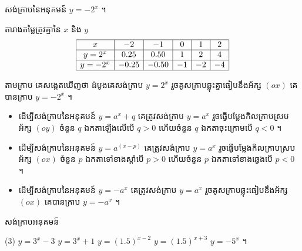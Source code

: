 \begin{example}[ឧទាហរណ៍ ឃ]
សង់ក្រាបនៃអនុគមន៍ $y = -2^x$ ។

តារាងតម្លៃត្រូវគ្នានៃ $x$ និង $y$
\[
\begin{array}{|c|c|c|c|c|c|}\hline
x & -2 & -1 & 0 & 1 & 2\\ \hline
y = 2^x & 0.25 & 0.50 & 1 & 2 & 4\\ \hline
y = -2^x & -0.25 & -0.50 & -1 & -2 & -4\\ \hline
\end{array}
\]
\begin{center}
\end{center}
តាមក្រាប គេសង្កេតឃើញថា ដំបូងគេសង់ក្រាប $y = 2^x$ រួចគូសក្រាបឆ្លុះគ្នាធៀបនឹងអ័ក្ស $(ox)$ គេបានក្រាប $y = -2^x$ ។
\end{example}

\begin{formulaBox}[ជាទូទៅ]
\begin{itemize}
  \item ដើម្បីសង់ក្រាបនៃអនុគមន៍ $y = a^x + q$ គេត្រូវសង់ក្រាប $y = a^x$ រួចធ្វើបម្លែងកិលក្រាបស្របអ័ក្ស $(oy)$ ចំនួន $q$ ឯកតាឡើងលើបើ $q > 0$ ហើយចំនួន $q$ ឯកតាចុះក្រោមបើ $q < 0$ ។
  \item ដើម្បីសង់ក្រាបនៃអនុគមន៍ $y = a^{(x-p)}$ គេត្រូវសង់ក្រាប $y = a^x$ រួចធ្វើបម្លែងកិលក្រាបស្របអ័ក្ស $(ox)$ ចំនួន $p$ ឯកតាទៅខាងស្តាំបើ $p > 0$ ហើយចំនួន $p$ ឯកតាទៅខាងឆ្វេងបើ $p < 0$ ។
  \item ដើម្បីសង់ក្រាបនៃអនុគមន៍ $y = -a^x$ គេត្រូវសង់ក្រាប $y = a^x$ រួចគូសក្រាបឆ្លុះធៀបនឹងអ័ក្ស $(ox)$ គេបានក្រាប $y = -a^x$ ។
\end{itemize}
\end{formulaBox}

\begin{pro}
សង់ក្រាបអនុគមន៍
\begin{tasks}(3)
  \task $y = 3^x - 3$
  \task $y = 3^x + 1$
  \task $y = (1.5)^{x-2}$
  \task $y = (1.5)^{x+3}$
  \task $y = -5^x$ ។
\end{tasks}
\end{pro}

